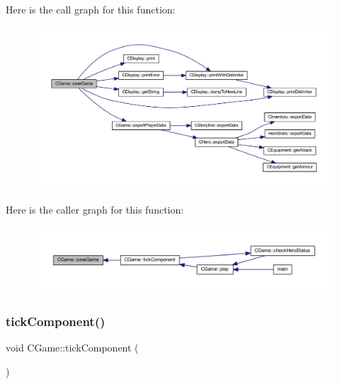 Here is the call graph for this function\+:\nopagebreak
\begin{figure}[H]
\begin{center}
\leavevmode
\includegraphics[width=350pt]{class_c_game_a49656fe4404b3df63f2dbebd9b754edd_cgraph}
\end{center}
\end{figure}
Here is the caller graph for this function\+:\nopagebreak
\begin{figure}[H]
\begin{center}
\leavevmode
\includegraphics[width=350pt]{class_c_game_a49656fe4404b3df63f2dbebd9b754edd_icgraph}
\end{center}
\end{figure}
\mbox{\label{class_c_game_a714b291af5e20aae8be14a905fd0522d}} 
\subsubsection{\texorpdfstring{tick\+Component()}{tickComponent()}}
{\footnotesize\ttfamily void C\+Game\+::tick\+Component (\begin{DoxyParamCaption}{ }\end{DoxyParamCaption})\hspace{0.3cm}{\ttfamily [protected]}}

